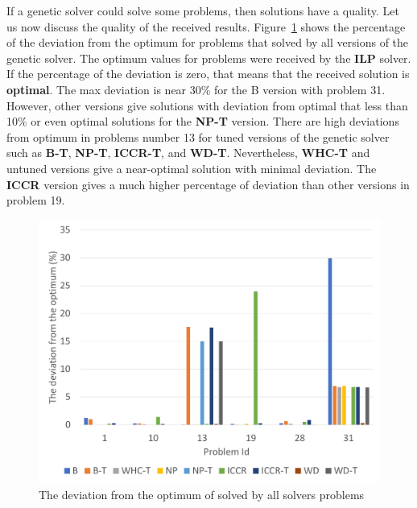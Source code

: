 If a genetic solver could solve some problems, then solutions have a quality.
Let us now discuss the quality of the received results. Figure~\ref{fig:EnergyPercentage} shows the percentage of the deviation from the optimum for problems that solved by all versions of the genetic solver. The optimum values for problems were received by the \textbf{ILP} solver. If the percentage of the deviation is zero, that means that the received solution is \textbf{optimal}. The max deviation is near 30\% for the B version with problem 31. However, other versions give solutions with deviation from optimal that less than 10\% or even optimal solutions for the \textbf{NP-T} version. There are high deviations from optimum in problems number 13 for tuned versions of the genetic solver such as \textbf{B-T}, \textbf{NP-T}, \textbf{ICCR-T}, and \textbf{WD-T}. Nevertheless, \textbf{WHC-T} and untuned versions give a near-optimal solution with minimal deviation. The \textbf{ICCR} version gives a much higher percentage of deviation than other versions in problem 19.

\begin{figure}
	\centering
	\includegraphics[width=\textwidth]{images/EnergyPercentage.pdf}
	\caption[The deviation from the optimum of solved by all solvers problems]{The deviation from the optimum of solved by all solvers problems}
	\label{fig:EnergyPercentage}
\end{figure}

